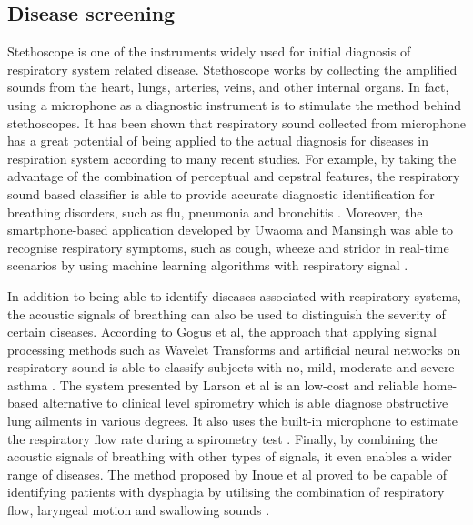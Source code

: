 \subsection{Disease screening}
Stethoscope is one of the instruments widely used for initial diagnosis of respiratory system related disease. Stethoscope works by collecting the amplified sounds from the heart, lungs, arteries, veins, and other internal organs. In fact, using a microphone as a diagnostic instrument is to stimulate the method behind stethoscopes. It has been shown that respiratory sound collected from microphone has a great potential of being applied to the actual diagnosis for diseases in respiration system according to many recent studies. For example, by taking the advantage of the combination of perceptual and cepstral features, the respiratory sound based classifier is able to provide accurate diagnostic identification for breathing disorders, such as flu, pneumonia and bronchitis \cite{Lei2014Content-basedFeatures}. Moreover, the smartphone-based application developed by Uwaoma and Mansingh was able to recognise respiratory symptoms, such as cough, wheeze and stridor in real-time scenarios by using machine learning algorithms with respiratory signal \cite{Uwaoma2017OnAlgorithms}. 

In addition to being able to identify diseases associated with respiratory systems, the acoustic signals of breathing can also be used to distinguish the severity of certain diseases. According to Gogus et al, the approach that applying signal processing methods such as Wavelet Transforms and artificial neural networks on respiratory sound is able to classify subjects with no, mild, moderate and severe asthma \cite{Gogus2015ClassificationNetworks}. The system presented by Larson et al is an low-cost and reliable home-based alternative to clinical level spirometry which is able diagnose obstructive lung ailments in various degrees. It also uses the built-in microphone to estimate the respiratory flow rate during a spirometry test \cite{Boriello2012SpiroSmart}. Finally, by combining the acoustic signals of breathing with other types of signals, it even enables a wider range of diseases. The method proposed by Inoue et al proved to be capable of identifying patients with dysphagia by utilising the combination of respiratory flow, laryngeal motion and swallowing sounds \cite{Oku2018UsingSwallowing}.


